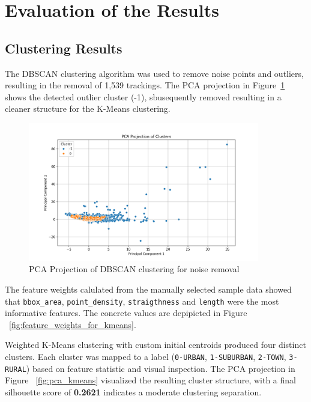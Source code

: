 \documentclass[a4paper,12pt,twoside]{scrreprt}
\begin{document}
\section{Evaluation of the Results}

\subsection{Clustering Results}

The DBSCAN clustering algorithm was used to remove noise points and outliers,
resulting in the removal of 1,539 trackings.
The PCA projection in Figure~\ref{fig:pca_dbscan} shows the detected outlier
cluster (-1), sbusequently removed resulting in a cleaner structure for the
K-Means clustering.

\begin{figure}[htbp]
  \centering

  \includegraphics[width=0.9\textwidth]{Figures/dbscan_diagram_feature_data.png}
  \caption{PCA Projection of DBSCAN clustering for noise removal}
  \label{fig:pca_dbscan}
\end{figure}
\FloatBarrier

The feature weights calulated from the manually selected sample data showed
that \texttt{bbox\_area}, \texttt{point\_density},
\texttt{straigthness} and \texttt{length} were the most informative features.
The concrete values are depipicted
in Figure ~\ref{fig:feature_weights_for_kmeans}.

Weighted K-Means clustering with custom initial centroids produced four
distinct clusters. Each cluster was mapped to a label (\texttt{0-URBAN},
\texttt{1-SUBURBAN}, \texttt{2-TOWN}, \texttt{3-RURAL}) based on feature
statistic and visual inspection.
The PCA projection in Figure ~\ref{fig:pca_kmeans} visualized the resulting
cluster structure, with a final silhouette score of \textbf{0.2621} indicates a
moderate clustering
separation.
\end{document}
